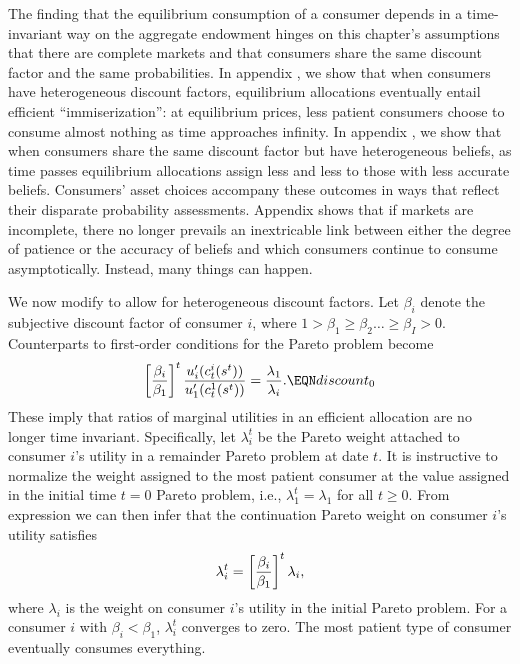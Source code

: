 \noindent
The  finding that the equilibrium consumption of a consumer
depends in a time-invariant way on the aggregate endowment hinges
 on this chapter's assumptions that there are  complete markets and  that
consumers  share the same  discount factor and the same probabilities.
In appendix , we show that when consumers have heterogeneous
discount factors,  equilibrium allocations eventually entail  efficient
 ``immiserization'': at equilibrium prices,  less patient
consumers choose to consume almost nothing
as time approaches infinity.
In appendix , we show that when consumers share the same discount factor but have  heterogeneous beliefs,  as  time passes  equilibrium allocations assign   less
and less  to those
with less accurate beliefs.
Consumers' asset choices accompany these outcomes in ways that reflect their disparate probability assessments.
Appendix  shows that if markets are incomplete, there no longer prevails an inextricable
link between  either the degree of patience or the
accuracy of beliefs and  which consumers continue to consume  asymptotically. Instead, many things can happen.




We now modify  to allow for heterogeneous discount
factors.  Let $\beta_i$ denote
the subjective discount factor of consumer $i$, where
$1 > \beta_1\geq \beta_2 \ldots \geq \beta_I > 0$.
Counterparts to first-order conditions  for the
Pareto problem become
$$ \left[ \beta_i \over \beta_1 \right]^t
{u_i^\prime(c^i_t(s^t)) \over u_1^\prime(c^1_t(s^t))}
                   = {\lambda_1  \over \lambda_i}.  \EQN discount_0 $$
These imply that ratios of marginal utilities in an efficient allocation are no longer time invariant.
 Specifically, let $\lambda^t_i$ be the
Pareto weight attached to consumer $i$'s utility in a
remainder Pareto problem at date $t$. It is instructive to
normalize  the weight assigned to the
most patient consumer at the value assigned in the initial time $t=0$
Pareto problem, i.e., $\lambda^t_1 = \lambda_1$ for all $t\geq0$.
From expression  we can then infer that the continuation
Pareto weight on consumer $i$'s utility satisfies
$$
\lambda^t_i =  \left[ \beta_i \over \beta_1 \right]^t \lambda_i,
$$
where $\lambda_i$ is the weight on consumer $i$'s utility in the
initial Pareto problem.
For a consumer $i$ with  $\beta_i < \beta_1$, $\lambda^t_i$ converges to
zero.  The most patient type of consumer eventually
consumes everything.


